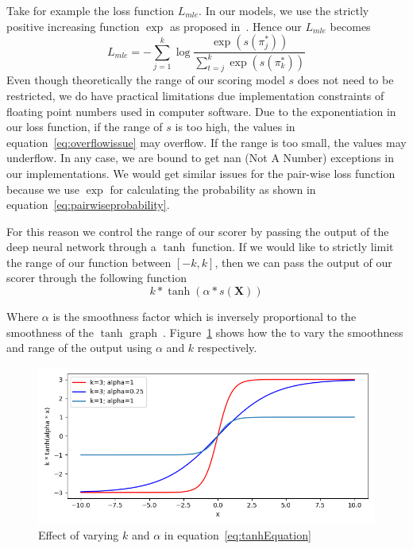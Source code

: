 \documentclass[12pt, twoside, ngerman]{report}
\begin{document}
Take for example the loss function $L_{mle}$.  In our models,  we use the strictly positive increasing function $\exp$ as proposed in~\cite{listmlepaper}.
Hence our $L_{mle}$ becomes 
\begin{equation}\label{eq:overflowissue}
L_{mle} = -  \sum\limits_{j=1}^{k} \log \frac{\exp(s(\pi^*_j))}{ \sum\limits_{t=j}^k \exp(s(\pi^*_k))}
\end{equation}
Even though theoretically the range of our scoring model $s$ does not need to be restricted,  we do have practical limitations due implementation constraints of floating point numbers used in computer software.
Due to the exponentiation in our loss function,  if the range of $s$ is too high,  the values in equation~\ref{eq:overflowissue} may overflow.
If the range is too small,  the values may underflow.
In any case,  we are bound to get nan (Not A Number) exceptions in our implementations.
We would get similar issues for the pair-wise loss function because we use $\exp$ for calculating the probability as shown in equation~\ref{eq:pairwiseprobability}.

For this reason we control the range of our scorer by passing the output of the deep neural network through a $\tanh$ function.
If we would like to strictly limit the range of our function between $[-k,  k]$,  then we can pass the output of our scorer through the following function
\begin{equation}\label{eq:tanhEquation}
k * \tanh(\alpha * s(\textbf{X}))
\end{equation}

Where $\alpha$ is the smoothness factor which is inversely proportional to the smoothness of the $\tanh$ graph~\cite{tanhstackoverflowanswer}.
Figure~\ref{fig:tanhGraph} shows how the to vary the smoothness and range of the output using $\alpha$ and $k$ respectively.

\begin{figure}[htb]
  \centering
    \includegraphics[scale=0.5]{images/tanhGraph}
    \caption{Effect of varying $k$ and $\alpha$ in equation~\ref{eq:tanhEquation}}
    \label{fig:tanhGraph}
\end{figure}
\end{document}
